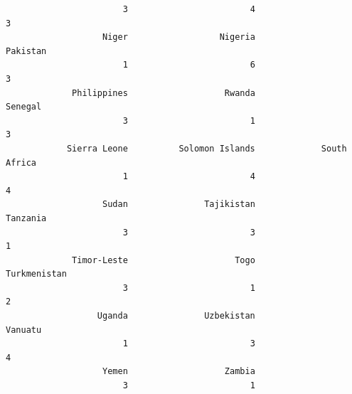 \documentclass[
]{article}
\newenvironment{Shaded}{}{}
\newcommand{\AttributeTok}[1]{#1}
\newcommand{\DecValTok}[1]{#1}
\newcommand{\FunctionTok}[1]{#1}
\newcommand{\NormalTok}[1]{#1}
\newcommand{\OtherTok}[1]{\textcolor[rgb]{1.00,0.25,0.00}{#1}}
\newcommand{\SpecialCharTok}[1]{\textcolor[rgb]{0.00,0.50,0.50}{#1}}
\begin{document}
\begin{verbatim}
                       3                        4                        3 
                   Niger                  Nigeria                 Pakistan 
                       1                        6                        3 
             Philippines                   Rwanda                  Senegal 
                       3                        1                        3 
            Sierra Leone          Solomon Islands             South Africa 
                       1                        4                        4 
                   Sudan               Tajikistan                 Tanzania 
                       3                        3                        1 
             Timor-Leste                     Togo             Turkmenistan 
                       3                        1                        2 
                  Uganda               Uzbekistan                  Vanuatu 
                       1                        3                        4 
                   Yemen                   Zambia 
                       3                        1 
\end{verbatim}

\begin{Shaded}
\end{Shaded}
\end{document}
